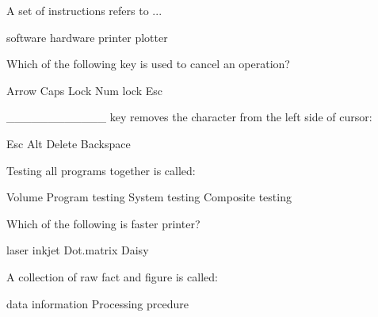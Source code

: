 \documentclass{exam}
\begin{document}
\begin{center}
\end{center}

\vspace{5mm}

\vspace{5mm}

\begin{questions}

\question 

A set of instructions refers to ...\\
\begin{oneparchoices}
\choice software
\choice hardware
\choice printer
\choice plotter
\end{oneparchoices}
\question 

Which of the following key is used to cancel an operation?\\
\begin{oneparchoices}
\choice Arrow
\choice Caps Lock
\choice Num lock
\choice Esc
\end{oneparchoices}
\question 

\_\_\_\_\_\_\_\_\_\_\_\_ key removes the character from the left side of cursor:\\
\begin{oneparchoices}
\choice Esc
\choice Alt
\choice Delete
\choice Backspace
\end{oneparchoices}
\question 

Testing all programs together is called:\\
\begin{oneparchoices}
\choice Volume
\choice Program testing
\choice System testing
\choice Composite testing
\end{oneparchoices}
\question 

Which of the following is faster printer?\\
\begin{oneparchoices}
\choice laser
\choice inkjet
\choice Dot.matrix
\choice Daisy
\end{oneparchoices}
\question 

A collection of raw fact and figure is called:\\
\begin{oneparchoices}
\choice data
\choice information
\choice Processing
\choice prcedure
\end{oneparchoices}
\question 


\end{questions}
\end{document}
